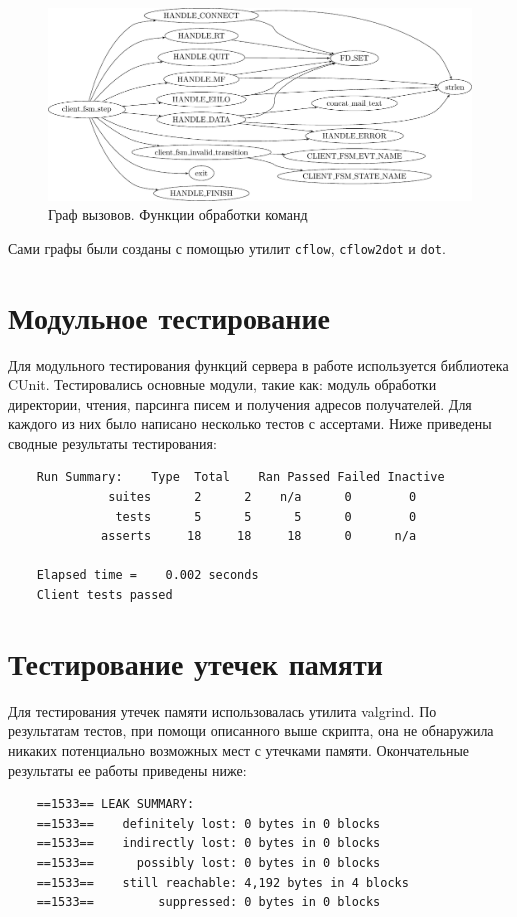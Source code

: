 \documentclass[a4paper,12pt]{report}
\begin{document}
\begin{figure}
\centering
\includegraphics[width=\textwidth]{include/cflow_handlers_dot.pdf}
\caption{Граф вызовов. Функции обработки команд}
\label{fig:cflow2}
\end{figure}

Сами графы были созданы с помощью утилит \texttt{cflow}, \texttt{cflow2dot} и \texttt{dot}.


\section{Модульное тестирование}

Для модульного тестирования функций сервера в работе используется библиотека CUnit. Тестировались основные модули, такие как: модуль обработки директории, чтения, парсинга писем и получения адресов получателей. Для каждого из них было написано несколько тестов с ассертами. Ниже приведены сводные результаты тестирования:
\begin{verbatim}
    Run Summary:    Type  Total    Ran Passed Failed Inactive
              suites      2      2    n/a      0        0
               tests      5      5      5      0        0
             asserts     18     18     18      0      n/a

    Elapsed time =    0.002 seconds
    Client tests passed
\end{verbatim}



\section{Тестирование утечек памяти}

Для тестирования утечек памяти использовалась утилита valgrind. По результатам тестов, при помощи описанного выше скрипта, она не обнаружила никаких потенциально возможных мест с утечками памяти. Окончательные результаты ее работы приведены ниже:
\begin{verbatim}
    ==1533== LEAK SUMMARY:
    ==1533==    definitely lost: 0 bytes in 0 blocks
    ==1533==    indirectly lost: 0 bytes in 0 blocks
    ==1533==      possibly lost: 0 bytes in 0 blocks
    ==1533==    still reachable: 4,192 bytes in 4 blocks
    ==1533==         suppressed: 0 bytes in 0 blocks

\end{verbatim}
\end{document}

